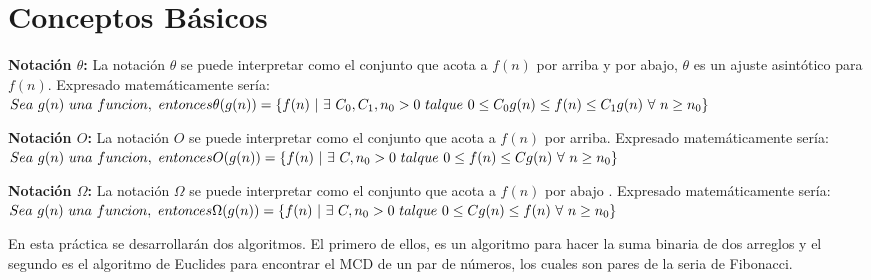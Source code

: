 \documentclass[12pt]{report}
\begin{document}
	
	\section{Conceptos Básicos}
	\textbf{Notación $\theta$:}
	La notación $\theta$ se puede interpretar como el conjunto que acota a $f(n)$ por arriba y por abajo, $\theta$ es un ajuste asintótico para $f(n)$. Expresado matemáticamente sería:\newline \\
	$Sea \ g(n) \ una \ funcion, \ entonces\newline \\
	\theta(g(n))=\{f(n) \ | \ \exists \ C_{0},C_{1},n_{0}>0 \ tal que \ 0\leq C_{0}g(n)\leq f(n)  \leq C_{1}g(n) \ \forall \ n\geq n_{0}\}$\newline
	
	\textbf{Notación $O$:}
	La notación $O$ se puede interpretar como el conjunto que acota a $f(n)$ por arriba. Expresado matemáticamente sería:\newline \\
	$Sea \ g(n) \ una \ funcion, \ entonces\newline \\
	O(g(n))=\{f(n) \ | \ \exists \ C,n_{0}>0 \ tal que \ 0\leq f(n)  \leq Cg(n) \ \forall \ n\geq n_{0}\}$\newline
	
	\textbf{Notación $\Omega$:}
	La notación $\Omega$ se puede interpretar como el conjunto que acota a $f(n)$  por abajo . Expresado matemáticamente sería:\newline \\
	$Sea \ g(n) \ una \ funcion, \ entonces\newline \\
	\Omega(g(n))=\{f(n) \ | \ \exists \ C,n_{0}>0 \ tal que \ 0\leq Cg(n)\leq f(n) \ \forall \ n\geq n_{0}\}$\newline
	
	En esta práctica se desarrollarán dos algoritmos. El primero de ellos, es un algoritmo para hacer la suma binaria de dos arreglos y el segundo es el algoritmo de Euclides para encontrar el MCD de un par de números, los cuales son pares de la seria de Fibonacci.\newpage
	
\end{document}
